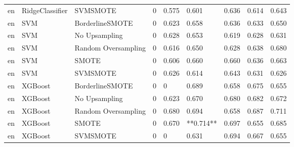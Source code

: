 \begin{tabular}{lllllllll}
      en &              RidgeClassifier &            SVMSMOTE &         0 &                     0.575 &                 0.601 &                  0.636 &                                   0.614 &     0.643 \\
      en &                          SVM &     BorderlineSMOTE &         0 &                     0.623 &                 0.658 &                  0.636 &                                   0.633 &     0.650 \\
      en &                          SVM &       No Upsampling &         0 &                     0.628 &                 0.653 &                  0.619 &                                   0.628 &     0.631 \\
      en &                          SVM & Random Oversampling &         0 &                     0.616 &                 0.650 &                  0.628 &                                   0.638 &     0.680 \\
      en &                          SVM &               SMOTE &         0 &                     0.606 &                 0.660 &                  0.660 &                                   0.636 &     0.663 \\
      en &                          SVM &            SVMSMOTE &         0 &                     0.626 &                 0.614 &                  0.643 &                                   0.631 &     0.626 \\
      en &                      XGBoost &     BorderlineSMOTE &         0 &                         0 &                 0.689 &                  0.658 &                                   0.675 &     0.655 \\
      en &                      XGBoost &       No Upsampling &         0 &                     0.623 &                 0.670 &                  0.680 &                                   0.682 &     0.672 \\
      en &                      XGBoost & Random Oversampling &         0 &                     0.680 &                 0.694 &                  0.658 &                                   0.687 &     0.711 \\
      en &                      XGBoost &               SMOTE &         0 &                     0.670 &             **0.714** &                  0.697 &                                   0.655 &     0.685 \\
      en &                      XGBoost &            SVMSMOTE &         0 &                         0 &                 0.631 &                  0.694 &                                   0.667 &     0.655 \\

\end{tabular}

